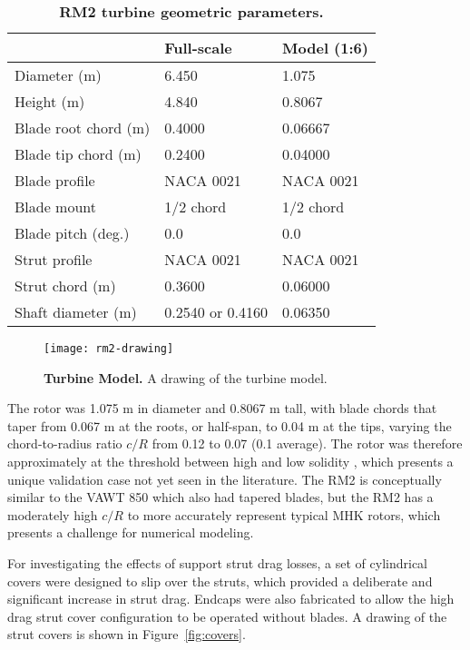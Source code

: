 \begin{table}[ht]
    \centering
    \begin{tabular}{l|l|l}
        & Full-scale & Model (1:6) \\
        \hline
        Diameter (m)   & 6.450 & 1.075 \\
        Height (m)     & 4.840 & 0.8067 \\
        Blade root chord (m) & 0.4000 & 0.06667 \\
        Blade tip chord (m)  & 0.2400 & 0.04000 \\
        Blade profile & NACA 0021 & NACA 0021 \\
        Blade mount & 1/2 chord & 1/2 chord \\
        Blade pitch (deg.) & 0.0 & 0.0 \\
        Strut profile & NACA 0021 & NACA 0021 \\
        Strut chord (m) & 0.3600 & 0.06000 \\
        Shaft diameter (m) & 0.2540 \cite{Beam2011} or 0.4160 \cite{Hill2014} & 0.06350\\
    \end{tabular}
    \caption{\textbf{RM2 turbine geometric parameters.}}
    \label{tab:turb-geom}
\end{table}

\begin{figure}
    \centering

    \texttt{[image: rm2-drawing]}
    
    \caption{{\bf Turbine Model.} A drawing of the turbine model.}
    
    \label{fig:turbine-drawing}
\end{figure}

The rotor was 1.075 m in diameter and 0.8067 m tall, with blade chords that
taper from 0.067 m at the roots, or half-span, to 0.04 m at the tips, varying
the chord-to-radius ratio $c/R$ from 0.12 to 0.07 (0.1 average). The rotor was
therefore approximately at the threshold between high and low solidity
\cite{Strickland1981,Fiedler2009}, which presents a unique validation case not
yet seen in the literature. The RM2 is conceptually similar to the VAWT 850
\cite{Mays1990} which also had tapered blades, but the RM2 has a moderately high
$c/R$ to more accurately represent typical MHK rotors, which presents a
challenge for numerical modeling.

For investigating the effects of support strut drag losses, a set of cylindrical
covers were designed to slip over the struts, which provided a deliberate and
significant increase in strut drag. Endcaps were also fabricated to allow the
high drag strut cover configuration to be operated without blades. A drawing of
the strut covers is shown in Figure~\ref{fig:covers}.

